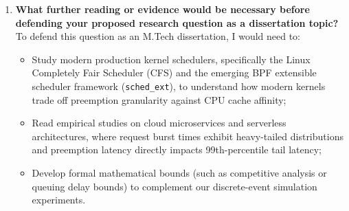 \documentclass[11pt]{article}
\begin{document}
\begin{enumerate}[leftmargin=1.5em, itemsep=1.0em]
    \item \textbf{What further reading or evidence would be necessary before defending your proposed research question as a dissertation topic?} \\
    To defend this question as an M.Tech dissertation, I would need to:
    \begin{itemize}[leftmargin=1.2em, itemsep=0.3em]
        \item Study modern production kernel schedulers, specifically the Linux Completely Fair Scheduler (CFS) and the emerging BPF extensible scheduler framework (\texttt{sched\_ext}), to understand how modern kernels trade off preemption granularity against CPU cache affinity;
        \item Read empirical studies on cloud microservices and serverless architectures, where request burst times exhibit heavy-tailed distributions and preemption latency directly impacts 99th-percentile tail latency;
        \item Develop formal mathematical bounds (such as competitive analysis or queuing delay bounds) to complement our discrete-event simulation experiments.
    \end{itemize}
\end{enumerate}
\end{document}

